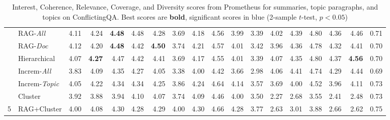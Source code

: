 \begin{table*}[]
\begin{tabular}{@{}clrrrrrrrrrrrrrrrc@{}}
 & \multicolumn{1}{l|}{RAG-\textit{All}} & \cellcolor[HTML]{DAE8FC}4.11 & \cellcolor[HTML]{DAE8FC}4.24 & \cellcolor[HTML]{DAE8FC}\textbf{4.48} & \cellcolor[HTML]{DAE8FC}4.48 & \multicolumn{1}{r|}{4.28} & 3.69 & 4.18 & 4.56 & 3.99 & \multicolumn{1}{r|}{3.39} & \cellcolor[HTML]{DAE8FC}4.02 & \cellcolor[HTML]{DAE8FC}4.39 & \cellcolor[HTML]{DAE8FC}4.80 & \cellcolor[HTML]{DAE8FC}4.36 & \multicolumn{1}{r|}{\cellcolor[HTML]{DAE8FC}4.46} & 0.71 \\
 & \multicolumn{1}{l|}{RAG-\textit{Doc}} & \cellcolor[HTML]{DAE8FC}4.12 & \cellcolor[HTML]{DAE8FC}4.20 & \cellcolor[HTML]{DAE8FC}\textbf{4.48} & \cellcolor[HTML]{DAE8FC}4.42 & \multicolumn{1}{r|}{\cellcolor[HTML]{DAE8FC}\textbf{4.50}} & 3.74 & 4.21 & 4.57 & 4.01 & \multicolumn{1}{r|}{3.42} & \cellcolor[HTML]{DAE8FC}3.96 & \cellcolor[HTML]{DAE8FC}4.36 & \cellcolor[HTML]{DAE8FC}4.78 & \cellcolor[HTML]{DAE8FC}4.32 & \multicolumn{1}{r|}{\cellcolor[HTML]{DAE8FC}4.41} & 0.70 \\
 & \multicolumn{1}{l|}{Hierarchical} & \cellcolor[HTML]{DAE8FC}4.07 & \cellcolor[HTML]{DAE8FC}\textbf{4.27} & 4.47 & \cellcolor[HTML]{DAE8FC}4.42 & \multicolumn{1}{r|}{\cellcolor[HTML]{DAE8FC}4.41} & 3.69 & 4.17 & 4.55 & 4.01 & \multicolumn{1}{r|}{3.39} & \cellcolor[HTML]{DAE8FC}4.07 & \cellcolor[HTML]{DAE8FC}4.35 & \cellcolor[HTML]{DAE8FC}4.80 & \cellcolor[HTML]{DAE8FC}4.37 & \multicolumn{1}{r|}{\cellcolor[HTML]{DAE8FC}\textbf{4.56}} & 0.70 \\
 & \multicolumn{1}{l|}{Increm-\textit{All}} & 3.83 & 4.09 & \cellcolor[HTML]{DAE8FC}4.35 & 4.27 & \multicolumn{1}{r|}{4.05} & 3.38 & 4.00 & 4.42 & 3.66 & \multicolumn{1}{r|}{2.98} & \cellcolor[HTML]{DAE8FC}4.06 & \cellcolor[HTML]{DAE8FC}4.41 & \cellcolor[HTML]{DAE8FC}4.74 & \cellcolor[HTML]{DAE8FC}4.29 & \multicolumn{1}{r|}{\cellcolor[HTML]{DAE8FC}4.44} & 0.69 \\
 & \multicolumn{1}{l|}{Increm-\textit{Topic}} & \cellcolor[HTML]{DAE8FC}4.05 & \cellcolor[HTML]{DAE8FC}4.22 & \cellcolor[HTML]{DAE8FC}4.34 & \cellcolor[HTML]{DAE8FC}4.34 & \multicolumn{1}{r|}{4.25} & 3.86 & 4.24 & 4.64 & 4.14 & \multicolumn{1}{r|}{3.57} & 3.69 & 4.00 & 4.52 & 3.96 & \multicolumn{1}{r|}{4.11} & 0.73 \\
 & \multicolumn{1}{l|}{Cluster} & 3.92 & 3.88 & 3.94 & 4.10 & \multicolumn{1}{r|}{4.07} & 3.74 & 4.09 & 4.46 & 4.00 & \multicolumn{1}{r|}{3.50} & 2.27 & 2.68 & 3.55 & 2.41 & \multicolumn{1}{r|}{2.48} & 0.73 \\
\multirow{-10}{*}{5} & \multicolumn{1}{l|}{RAG+Cluster} & 4.00 & 4.08 & 4.30 & 4.28 & \multicolumn{1}{r|}{4.29} & \cellcolor[HTML]{DAE8FC}4.00 & \cellcolor[HTML]{DAE8FC}4.30 & \cellcolor[HTML]{DAE8FC}4.66 & 4.28 & \multicolumn{1}{r|}{3.77} & 2.63 & 3.01 & 3.88 & 2.66 & \multicolumn{1}{r|}{2.62} & 0.75 \\ \bottomrule
\end{tabular}
\caption{\label{appendix:table:llm_cqa} Interest, Coherence, Relevance, Coverage, and Diversity scores from Prometheus for summaries, topic paragraphs, and topics on ConflictingQA. Best scores are \textbf{bold}, significant scores in \colorbox{myblue}{blue} (2-sample $t$-test, $p<0.05$)}
\end{table*}